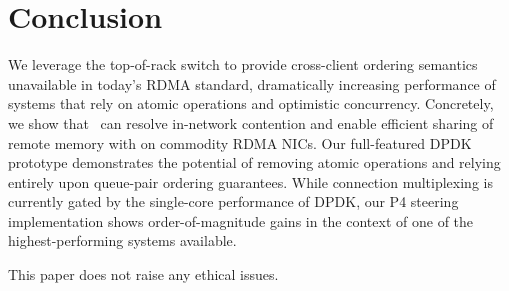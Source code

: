 \section{Conclusion}

We leverage the top-of-rack switch to provide cross-client ordering
semantics unavailable in today's RDMA standard, dramatically
increasing performance of systems that rely on atomic operations and
optimistic concurrency.  Concretely, we show that \sword\ can resolve
in-network contention and enable efficient sharing of remote memory
with on commodity RDMA NICs.
 Our full-featured DPDK prototype demonstrates the potential of
 removing atomic operations and relying entirely upon queue-pair
 ordering guarantees.  While connection multiplexing is currently
 gated by the single-core performance of DPDK, our P4 steering
 implementation shows order-of-magnitude gains in the context of one
 of the highest-performing systems available.

 This paper does not raise any ethical issues.
